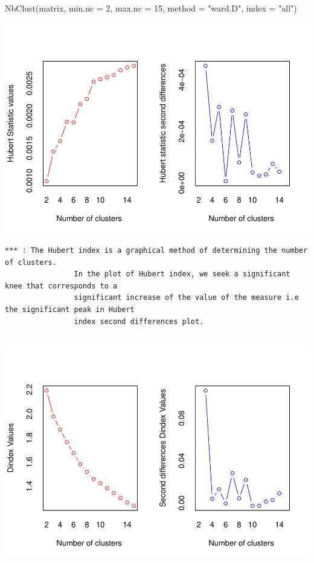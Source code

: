\documentclass[
]{article}
\newenvironment{Shaded}{}{}
\newcommand{\AttributeTok}[1]{#1}
\newcommand{\DecValTok}[1]{#1}
\newcommand{\FunctionTok}[1]{#1}
\newcommand{\NormalTok}[1]{#1}
\newcommand{\StringTok}[1]{\textcolor[rgb]{0.00,0.50,0.50}{#1}}
\begin{document}
\begin{Shaded}
\begin{Highlighting}[]
\FunctionTok{NbClust}\NormalTok{(matrix, }\AttributeTok{min.nc =} \DecValTok{2}\NormalTok{, }\AttributeTok{max.nc =} \DecValTok{15}\NormalTok{, }\AttributeTok{method =} \StringTok{"ward.D"}\NormalTok{, }\AttributeTok{index =} \StringTok{"all"}\NormalTok{)}
\end{Highlighting}
\end{Shaded}

\includegraphics{Projet_files/figure-latex/unnamed-chunk-17-1.pdf}

\begin{verbatim}
*** : The Hubert index is a graphical method of determining the number of clusters.
                In the plot of Hubert index, we seek a significant knee that corresponds to a 
                significant increase of the value of the measure i.e the significant peak in Hubert
                index second differences plot. 
 
\end{verbatim}

\includegraphics{Projet_files/figure-latex/unnamed-chunk-17-2.pdf}
\end{document}
